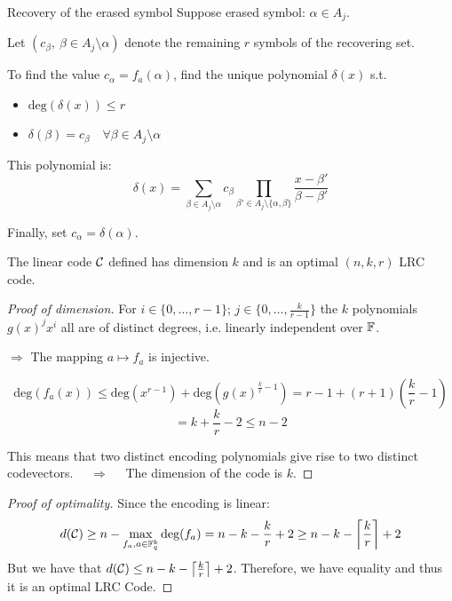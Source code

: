 \begin{frame}{Recovery of the erased symbol}
    Suppose erased symbol: $\alpha \in A_j$.
    
    Let $\left( c_{\beta}, \ \beta \in A_j \setminus \alpha \right)$ denote the remaining $r$ symbols of the recovering set.
    
    To find the value $c_{\alpha} = f_a(\alpha)$, find the unique polynomial $\delta(x)$ s.t.
    \begin{itemize}
        \item $\text{deg}(\delta(x)) \leq r$
        \item $\delta(\beta) = c_{\beta} \quad \forall \beta \in A_j \setminus \alpha$
    \end{itemize}
    
    This polynomial is:
    $$\delta(x) = \sum_{\beta \in A_j \setminus \alpha} c_{\beta} \prod_{\beta ' \in A_j \setminus \{\alpha, \beta\}} \frac{x - \beta'}{\beta - \beta '}$$

    Finally, set $c_{\alpha} = \delta(\alpha)$.
    
\end{frame}

\begin{frame}
    \begin{thm}
        The linear code $\mathcal{C}$ defined has dimension $k$ and is an optimal $(n,k,r)$ LRC code.
    \end{thm}
\end{frame}

\begin{frame}
    \begin{proof}[Proof of dimension]
        For $i \in \{0, \dots, r-1 \}$; $j \in \{0, \dots, \frac{k}{r-1}\}$ the $k$ polynomials $g(x)^j x^i$ all are of distinct degrees, i.e. linearly independent over $\mathbb{F}$.
        
        $\Rightarrow$ The mapping $a \mapsto f_a$ is injective.
        
        $$\mbox{deg}(f_a(x)) \leq \mbox{deg}(x^{r-1}) + \mbox{deg}(g(x)^{\frac{k}{r}-1}) = r-1 + (r+1)(\frac{k}{r}-1)$$
        $$= k + \frac{k}{r} - 2 \leq n - 2$$
        
        This means that two distinct encoding polynomials give rise to two distinct codevectors. $\quad \Rightarrow \quad $ The dimension of the code is $k$.
    \end{proof}
\end{frame}

\begin{frame}
    \begin{proof}[Proof of optimality]
        Since the encoding is linear:
        $$d(\mathcal{C}) \geq n - \max_{f_a, a\in \mathbb{F}_q^k} \mbox{deg}(f_a) = n - k - \frac{k}{r} + 2 \geq n - k - \left\lceil\frac{k}{r}\right\rceil + 2$$
        But we have that $d(\mathcal{C}) \leq n - k - \left\lceil\frac{k}{r}\right\rceil + 2$.
        Therefore, we have equality and thus it is an optimal LRC Code.
    \end{proof}
\end{frame}